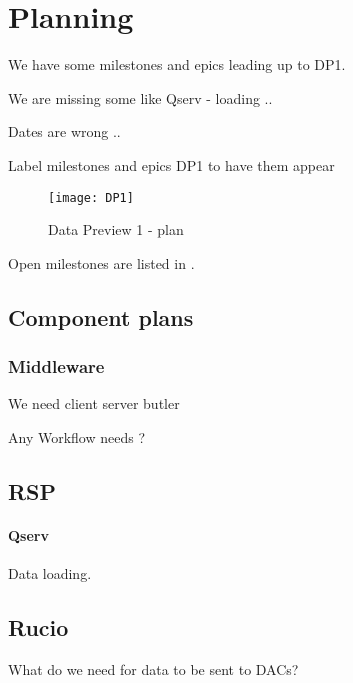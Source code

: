\section{Planning} \label{sec:plan}

We have some milestones and epics leading up to DP1.

We are missing some like Qserv - loading ..

Dates are wrong ..

Label milestones and epics DP1 to have them appear

\begin{figure}
\begin{centering}
\texttt{[image: DP1]}
	\caption{Data Preview 1 - plan \label{fig:plan}}
\end{centering}
\end{figure}


\newpage
Open milestones are listed in .



\subsection{Component plans}
\subsubsection{Middleware}
We need client server butler 

Any Workflow needs ?

\subsection{RSP}

\paragraph{Qserv}
Data loading.


\subsection{Rucio}
What do we need for data to be sent to DACs?

